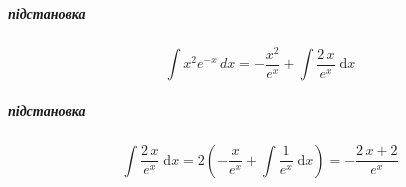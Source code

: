 \documentclass[../rgr1.tex]{subfiles}
\begin{document}
\Solution

\subparagraph{підстановка}
\noindent\begin{varwidth}{\linewidth}
\end{varwidth}
\begin{equation}
	\int x^2e^{-x} \, dx =
	-\dfrac{{x}^{2}}{{e}^{x}}+\int{\dfrac{2\,x}{{e}^{x}}}{\;\mathrm{d}x}
\end{equation}

\subparagraph{підстановка}
\noindent\begin{varwidth}{\linewidth}
\end{varwidth}
\begin{equation}
	\int{\dfrac{2\,x}{{e}^{x}}}{\;\mathrm{d}x}=
	2\left(-\dfrac{x}{{e}^{x}}+\int{\dfrac{1}{{e}^{x}}}{\;\mathrm{d}x}\right)=
	-\dfrac{2\,x+2}{{e}^{x}}
\end{equation}


\end{document}
